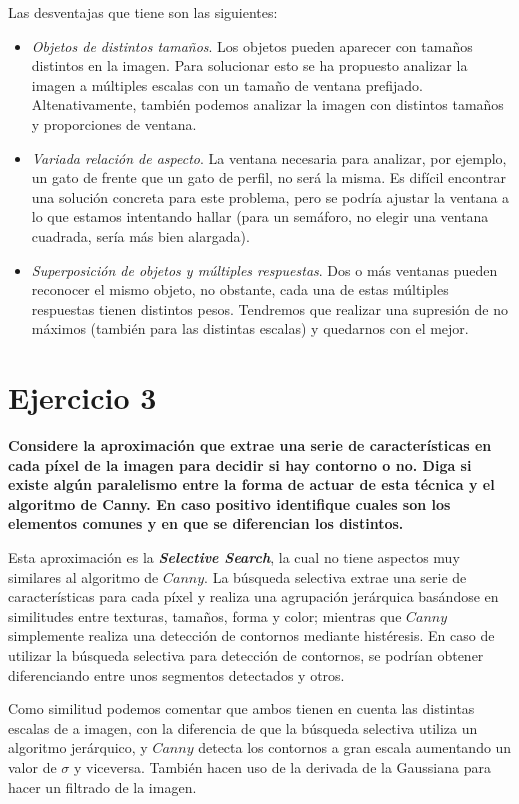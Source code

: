 \documentclass[11pt,a4paper]{article}
\begin{document}
Las desventajas que tiene son las siguientes:
\begin{itemize}
	\item \textit{Objetos de distintos tamaños}. Los objetos pueden aparecer con tamaños distintos en la imagen. Para solucionar esto se ha propuesto analizar
          la imagen a múltiples escalas con un tamaño de ventana prefijado. Altenativamente, también podemos analizar la imagen con distintos tamaños y proporciones
          de ventana.
	\item \textit{Variada relación de aspecto}. La ventana necesaria para analizar, por ejemplo, un gato de frente que un gato de perfil, no será la misma.
		  Es difícil encontrar una solución concreta para este problema, pero se podría ajustar la ventana a lo que estamos intentando hallar (para un semáforo,
          no elegir una ventana cuadrada, sería más bien alargada).
	\item \textit{Superposición de objetos y múltiples respuestas}. Dos o más ventanas pueden reconocer el mismo objeto, no obstante, cada una de estas múltiples
		  respuestas tienen distintos pesos. Tendremos que realizar una supresión de no máximos (también para las distintas escalas) y quedarnos con el mejor.
\end{itemize}


\section*{Ejercicio 3}

\textbf{Considere la aproximación que extrae una serie de características en cada píxel de la imagen para decidir si hay contorno o no. Diga si existe algún
paralelismo entre la forma de actuar de esta técnica y el algoritmo de Canny. En caso positivo identifique cuales son los elementos comunes y en que se
diferencian los distintos.}

Esta aproximación es la \textbf{\textit{Selective Search}}, la cual no tiene aspectos muy similares al algoritmo de $Canny$. La búsqueda selectiva extrae una
serie de características para cada píxel y realiza una agrupación jerárquica basándose en similitudes entre texturas, tamaños, forma y color; mientras que
$Canny$ simplemente realiza una detección de contornos mediante histéresis. En caso de utilizar la búsqueda selectiva para detección de contornos, se podrían
obtener diferenciando entre unos segmentos detectados y otros.

Como similitud podemos comentar que ambos tienen en cuenta las distintas escalas de a imagen, con la diferencia de que la búsqueda selectiva utiliza un algoritmo
jerárquico, y $Canny$ detecta los contornos a gran escala aumentando un valor de $\sigma$ y viceversa. También hacen uso de la derivada de la Gaussiana
para hacer un filtrado de la imagen.
\end{document}
